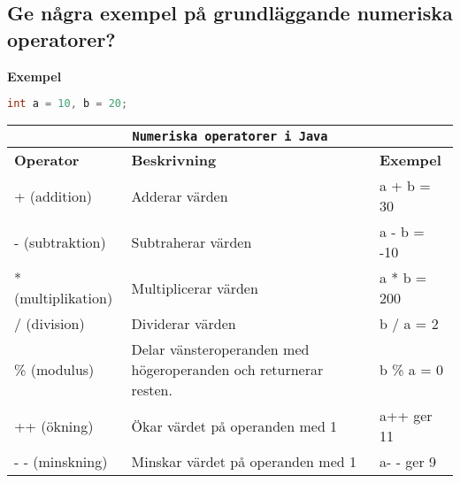 \documentclass[../main.tex]{subfiles}
\begin{document}
\subsection{Ge några exempel på grundläggande numeriska operatorer?}
\textbf{Exempel}
\begin{lstlisting}[language=java]
int a = 10, b = 20;
\end{lstlisting}
\begin{tabular}{ |p{3cm}|p{3cm}|p{3cm}| }
 \hline
 \multicolumn{3}{|c|}{\texttt{Numeriska operatorer i Java}} \\
 \hline
 \textbf{Operator}& \textbf{Beskrivning}& \textbf{Exempel}\\
 \hline
 + (addition) & Adderar värden & a + b = 30 \\
 \hline
 - (subtraktion) & Subtraherar värden & a - b = -10 \\
 \hline
 * (multiplikation) & Multiplicerar värden & a * b = 200 \\
 \hline
 / (division) & Dividerar värden & b / a = 2 \\
 \hline
 \% (modulus) & Delar vänsteroperanden med högeroperanden och returnerar resten. & b \% a = 0 \\
 \hline
 ++ (ökning) & Ökar värdet på operanden med 1 & a++ ger 11 \\
 \hline
 - -  (minskning) & Minskar värdet på operanden med 1 & a- - ger 9 \\
 \hline
 
\end{tabular}
\end{document}
